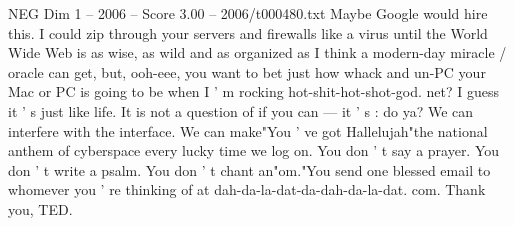 \begin{textsample}{NEG Dim 1 – 2006 – Score 3.00 – 2006/t000480.txt}
Maybe Google would hire this.
I could zip through your servers and firewalls like a virus until the World Wide Web is as wise, as wild and as organized as I think a modern-day miracle / oracle can get, but, ooh-eee, you want to bet just how whack and un-PC your Mac or PC is going to be when I ' m rocking hot-shit-hot-shot-god. net?
I guess it ' s just like life.
It is not a question of if you can — it ' s : do ya?
We can interfere with the interface.
We can make"You ' ve got Hallelujah"the national anthem of cyberspace every lucky time we log on.
You don ' t say a prayer.
You don ' t write a psalm.
You don ' t chant an"om."You send one blessed email to whomever you ' re thinking of at dah-da-la-dat-da-dah-da-la-dat. com.
Thank you, TED.

\end{textsample}
